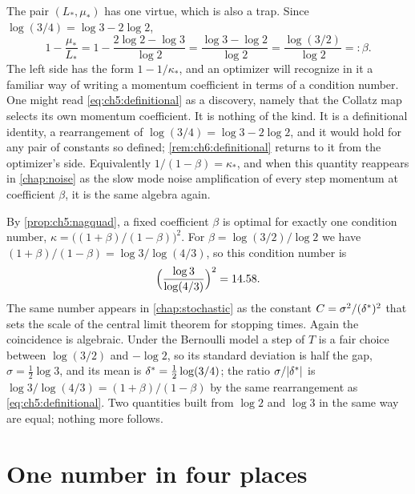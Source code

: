 The pair $(L_\ast,\mu_\ast)$ has one virtue, which is also a trap.  Since
$\log(3/4)=\log3-2\log2$,
\begin{equation}\label{eq:ch5:definitional}
  1-\frac{\mu_\ast}{L_\ast}
  =1-\frac{2\log2-\log3}{\log2}
  =\frac{\log3-\log2}{\log2}
  =\frac{\log(3/2)}{\log 2}
  =:\beta .
\end{equation}
The left side has the form $1-1/\kappa_\ast$, and an optimizer will recognize
in it a familiar way of writing a momentum coefficient in terms of a condition
number.  One might read \eqref{eq:ch5:definitional} as a discovery,
namely that the Collatz map selects its own momentum coefficient.  It is
nothing of the kind.  It is a definitional identity, a rearrangement of
$\log(3/4)=\log 3-2\log 2$, and it would hold for any pair of constants so
defined; \cref{rem:ch6:definitional} returns to it from the optimizer's side.
Equivalently $1/(1-\beta)=\kappa_\ast$, and when this quantity reappears in
\cref{chap:noise} as the slow mode noise amplification of every step momentum
at coefficient $\beta$, it is the same algebra again.

\begin{remark}\label{rem:ch5:clt}
By \cref{prop:ch5:nagquad}, a fixed coefficient $\beta$ is optimal for exactly
one condition number, $\kappa=\bigl((1+\beta)/(1-\beta)\bigr)^2$.  For
$\beta=\log(3/2)/\log2$ we have $(1+\beta)/(1-\beta)=\log3/\log(4/3)$, so this
condition number is
\[
  \Bigl(\frac{\log 3}{\log(4/3)}\Bigr)^2=14.58 .
\]
The same number appears in \cref{chap:stochastic} as the constant
$C=\sigma^2/(\delta^{*})^2$ that sets the scale of the central limit theorem for
stopping times.  Again the coincidence is algebraic.  Under the Bernoulli model a
step of $T$ is a fair choice between $\log(3/2)$ and $-\log 2$, so its standard
deviation is half the gap, $\sigma=\tfrac12\log 3$, and its mean is
$\delta^{*}=\tfrac12\log(3/4)$; the ratio $\sigma/|\delta^{*}|$ is
$\log3/\log(4/3)=(1+\beta)/(1-\beta)$ by the same rearrangement as
\eqref{eq:ch5:definitional}.  Two quantities built from $\log 2$ and $\log 3$
in the same way are equal; nothing more follows.
\end{remark}

\section{One number in four places}\label{sec:ch5:beta}


